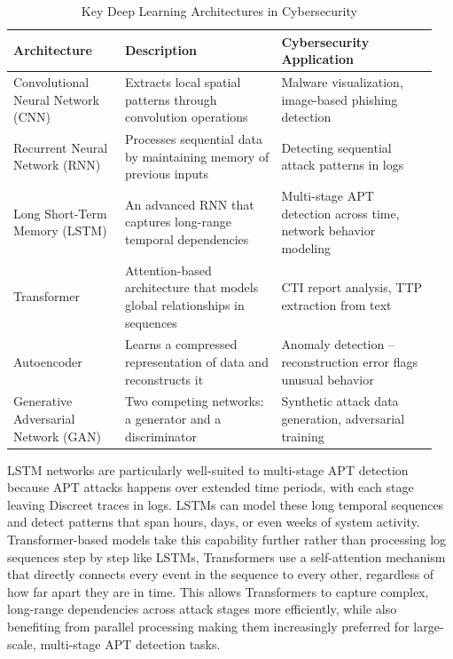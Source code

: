 \begin{table}[H]
\centering
\caption{Key Deep Learning Architectures in Cybersecurity}
\medskip
\begin{tabular}{|p{0.25\linewidth}|p{0.35\linewidth}|p{0.35\linewidth}|}
\hline
\textbf{Architecture} & \textbf{Description} & \textbf{Cybersecurity Application} \\ \hline
Convolutional Neural Network (CNN) & Extracts local spatial patterns through convolution operations & Malware visualization, image-based phishing detection \\ \hline
Recurrent Neural Network (RNN) & Processes sequential data by maintaining memory of previous inputs & Detecting sequential attack patterns in logs \\ \hline
Long Short-Term Memory (LSTM) & An advanced RNN that captures long-range temporal dependencies~\cite{hochreiter1997lstm} & Multi-stage APT detection across time, network behavior modeling \\ \hline
Transformer & Attention-based architecture that models global relationships in sequences & CTI report analysis, TTP extraction from text \\ \hline
Autoencoder & Learns a compressed representation of data and reconstructs it & Anomaly detection -- reconstruction error flags unusual behavior \\ \hline
Generative Adversarial Network (GAN) & Two competing networks: a generator and a discriminator & Synthetic attack data generation, adversarial training \\ \hline
\end{tabular}

\label{tab:dl_architectures}
\end{table}

LSTM networks are particularly well-suited to multi-stage APT detection because APT attacks happens over extended time periods, with each stage leaving Discreet  traces in logs. LSTMs can model these long temporal sequences and detect patterns that span hours, days, or even weeks of system activity. Transformer-based models take this capability further  rather than processing log sequences step by step like LSTMs, Transformers use a self-attention mechanism that directly connects every event in the sequence to every other, regardless of how far apart they are in time. This allows Transformers to capture complex, long-range dependencies across attack stages more efficiently, while also benefiting from parallel processing  making them increasingly preferred for large-scale, multi-stage APT detection tasks.

